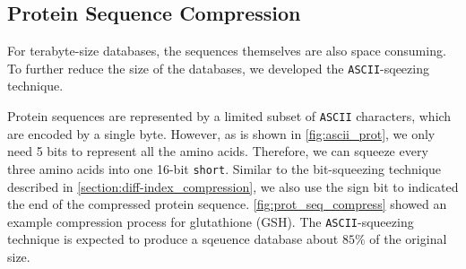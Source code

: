 \subsection{Protein Sequence Compression}

For terabyte-size databases, the sequences themselves are also space consuming. To further reduce the size of the databases, we developed the \texttt{ASCII}-sqeezing technique.

Protein sequences are represented by a limited subset of \texttt{ASCII} characters, which are encoded by a single byte. However, as is shown in \autoref{fig:ascii_prot}, we only need 5 bits to represent all the amino acids. Therefore, we can squeeze every three amino acids into one 16-bit \texttt{short}. Similar to the bit-squeezing technique described in \cref{section:diff-index_compression}, we also use the sign bit to indicated the end of the compressed protein sequence. \autoref{fig:prot_seq_compress} showed an example compression process for glutathione (GSH). The \texttt{ASCII}-squeezing technique is expected to produce a sqeuence database about $85\%$ of the original size.


